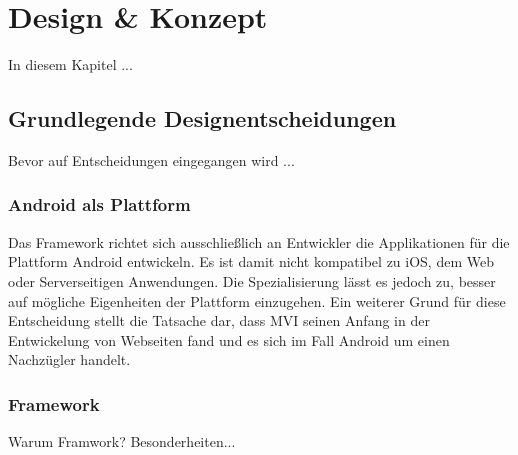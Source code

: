 \section{Design \& Konzept}
\label{sec:design-und-konzept}
In diesem Kapitel ...

\subsection{Grundlegende Designentscheidungen}
Bevor auf Entscheidungen eingegangen wird ...

\subsubsection{Android als Plattform}
Das Framework richtet sich ausschließlich an Entwickler die Applikationen für die Plattform Android entwickeln. Es ist damit nicht kompatibel zu iOS, dem Web oder Serverseitigen Anwendungen. Die Spezialisierung lässt es jedoch zu, besser auf mögliche Eigenheiten der Plattform einzugehen. Ein weiterer Grund für diese Entscheidung stellt die Tatsache dar, dass MVI seinen Anfang in der Entwickelung von Webseiten fand und es sich im Fall Android um einen Nachzügler handelt.

\subsubsection{Framework}
Warum Framwork? Besonderheiten...

